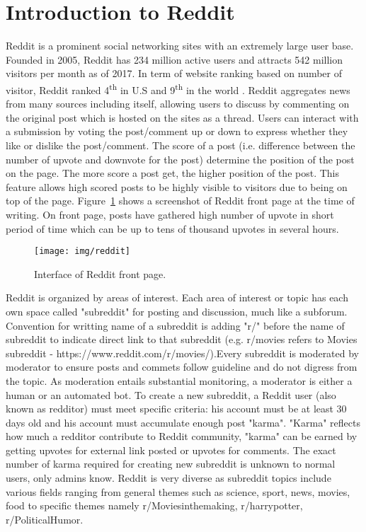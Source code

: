 \section{Introduction to Reddit}
Reddit is a prominent social networking sites with an extremely large user base. Founded in 2005, Reddit has 234 million active users and attracts 542 million visitors per month as of 2017. In term of website ranking based on number of visitor, Reddit ranked 4\textsuperscript{th} in U.S and 9\textsuperscript{th} in the world \cite{Alexa2017}. Reddit aggregates news from many sources including itself, allowing users to discuss by commenting on the original post which is hosted on the sites as a thread. Users can interact with a submission by voting the post/comment up or down to express whether they like or dislike the post/comment. The score of a post (i.e. difference between the number of upvote and downvote for the post) determine the position of the post on the page. The more score a post get, the higher position of the post. This feature allows high scored posts to be highly visible to visitors due to being on top of the page. Figure~\ref{fig:reddit} shows a screenshot of Reddit front page at the time of writing. On front page, posts have gathered high number of upvote in short period of time which can be up to tens of thousand upvotes in several hours.
\begin{figure}[h!]
\centering
\texttt{[image: img/reddit]}
\caption{Interface of Reddit front page.} 
\label{fig:reddit}
\end{figure} 
Reddit is organized by areas of interest. Each area of interest or topic has each own space called "subreddit" for posting and discussion, much like a subforum. Convention for writting name of a subreddit is adding "r/" before the name of subreddit to indicate direct link to that subreddit (e.g. r/movies refers to Movies subreddit - https://www.reddit.com/r/movies/).Every subreddit is moderated by moderator to ensure posts and commets follow guideline and do not digress from the topic. As moderation entails substantial monitoring, a moderator is either a human or an automated bot. To create a new subreddit, a Reddit user (also known as redditor) must meet specific criteria: his account must be at least 30 days old and his account must accumulate enough post "karma". "Karma" reflects how much a redditor contribute to Reddit community, "karma" can be earned by getting upvotes for external link posted or upvotes for comments. The exact number of karma required for creating new subreddit is unknown to normal users, only admins know. Reddit is very diverse as subreddit topics include various fields ranging from general themes such as science, sport, news, movies, food to specific themes namely r/Moviesinthemaking, r/harrypotter, r/PoliticalHumor.\\
